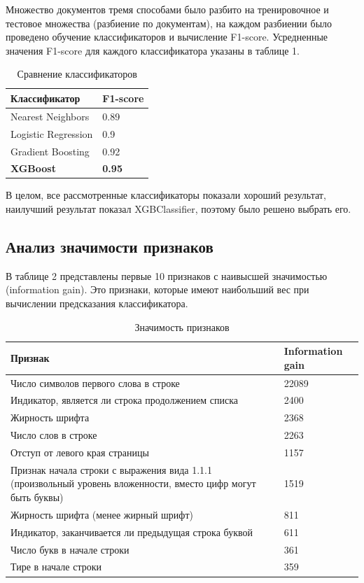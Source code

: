 \documentclass[10pt, a4paper]{ieeeconf}
\begin{document}
Множество документов тремя способами было разбито на тренировочное и тестовое множества (разбиение по документам), на каждом разбиении было проведено обучение классификаторов и вычисление F1-score. Усредненные значения F1-score для каждого классификатора указаны в таблице 1.
\begin{table}[h]
\begin{center}
\begin{tabular}{ |p{3cm}||p{3cm}| }
 \hline
 \bf Классификатор & \bf F1-score \\
 \hline
 \hline
 Nearest Neighbors & 0.89\\
 \hline
 Logistic Regression& 0.9\\
 \hline
 Gradient Boosting & 0.92\\
 \hline
 \bf XGBoost & \bf 0.95\\
 \hline
\end{tabular}
\end{center}
\caption{Сравнение классификаторов}
\end{table}

В целом, все рассмотренные классификаторы показали хороший результат, наилучший результат показал XGBClassifier, поэтому было решено выбрать его.

\subsection{Анализ значимости признаков}

В таблице 2 представлены первые 10 признаков с наивысшей значимостью (information gain). Это признаки, которые имеют наибольший вес при вычислении предсказания классификатора.

\begin{table}[h]
\begin{center}
\begin{tabular}{ |p{4cm}||p{2cm}| }
 \hline
 \bf Признак & \bf Information gain \\
 \hline
 \hline
 Число символов первого слова в строке & 22089\\
 \hline
 Индикатор, является ли строка продолжением списка & 2400\\
 \hline
 Жирность шрифта & 2368\\
 \hline
 Число слов в строке & 2263\\
 \hline
 Отступ от левого края страницы & 1157\\
 \hline
 Признак начала строки с выражения вида 1.1.1 (произвольный уровень вложенности, вместо цифр могут быть буквы) & 1519\\
 \hline
 Жирность шрифта (менее жирный шрифт) & 811\\
 \hline
 Индикатор, заканчивается ли предыдущая строка буквой & 611\\
 \hline
 Число букв в начале строки & 361\\
 \hline
 Тире в начале строки & 359\\
 \hline
\end{tabular}
\end{center}
\caption{Значимость признаков}
\end{table}
\end{document}
